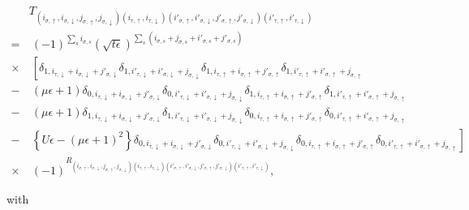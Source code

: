 \documentclass[nofootinbib,prd,aps,superscriptaddress,preprintnumbers,twocolumn,showpacs]{revtex4-1}
\begin{document}
\begin{widetext}
\begin{align}
	&T_{(i_{\sigma,\uparrow},i_{\sigma,\downarrow},j_{\sigma,\uparrow},j_{\sigma,\downarrow})(i_{\tau,\uparrow},i_{\tau,\downarrow})(i'_{\sigma,\uparrow},i'_{\sigma,\downarrow},j'_{\sigma,\uparrow},j'_{\sigma,\downarrow})(i'_{\tau,\uparrow},i'_{\tau,\downarrow})}\nonumber\\
	=&~(-1)^{\sum_{s}i_{\sigma,s}}(\sqrt{t\epsilon})^{\sum_{s}(i_{\sigma,s}+j_{\sigma,s}+i'_{\sigma,s}+j'_{\sigma,s})}\nonumber\\
	\times&~\left[\delta_{1,i_{\tau,\downarrow}+i_{\sigma,\downarrow}+j'_{\sigma,\downarrow}}\delta_{1,i'_{\tau,\downarrow}+i'_{\sigma,\downarrow}+j_{\sigma,\downarrow}}\delta_{1,i_{\tau,\uparrow}+i_{\sigma,\uparrow}+j'_{\sigma,\uparrow}}\delta_{1,i'_{\tau,\uparrow}+i'_{\sigma,\uparrow}+j_{\sigma,\uparrow}}\right.\nonumber\\
	-&~(\mu\epsilon+1)\delta_{0,i_{\tau,\downarrow}+i_{\sigma,\downarrow}+j'_{\sigma,\downarrow}}\delta_{0,i'_{\tau,\downarrow}+i'_{\sigma,\downarrow}+j_{\sigma,\downarrow}}\delta_{1,i_{\tau,\uparrow}+i_{\sigma,\uparrow}+j'_{\sigma,\uparrow}}\delta_{1,i'_{\tau,\uparrow}+i'_{\sigma,\uparrow}+j_{\sigma,\uparrow}}\nonumber\\
	-&~(\mu\epsilon+1)\delta_{1,i_{\tau,\downarrow}+i_{\sigma,\downarrow}+j'_{\sigma,\downarrow}}\delta_{1,i'_{\tau,\downarrow}+i'_{\sigma,\downarrow}+j_{\sigma,\downarrow}}\delta_{0,i_{\tau,\uparrow}+i_{\sigma,\uparrow}+j'_{\sigma,\uparrow}}\delta_{0,i'_{\tau,\uparrow}+i'_{\sigma,\uparrow}+j_{\sigma,\uparrow}}\nonumber\\
	-&~\left\{U\epsilon-(\mu\epsilon+1)^{2}\right\}\left.\delta_{0,i_{\tau,\downarrow}+i_{\sigma,\downarrow}+j'_{\sigma,\downarrow}}\delta_{0,i'_{\tau,\downarrow}+i'_{\sigma,\downarrow}+j_{\sigma,\downarrow}}\delta_{0,i_{\tau,\uparrow}+i_{\sigma,\uparrow}+j'_{\sigma,\uparrow}}\delta_{0,i'_{\tau,\uparrow}+i'_{\sigma,\uparrow}+j_{\sigma,\uparrow}}\right]\nonumber\\
	\times&~(-1)^{R_{(i_{\sigma,\uparrow},i_{\sigma,\downarrow},j_{\sigma,\uparrow},j_{\sigma,\downarrow})(i_{\tau,\uparrow},i_{\tau,\downarrow})(i'_{\sigma,\uparrow},i'_{\sigma,\downarrow},j'_{\sigma,\uparrow},j'_{\sigma,\downarrow})(i'_{\tau,\uparrow},i'_{\tau,\downarrow})}},
\end{align}
\end{widetext}
with
\end{document}
